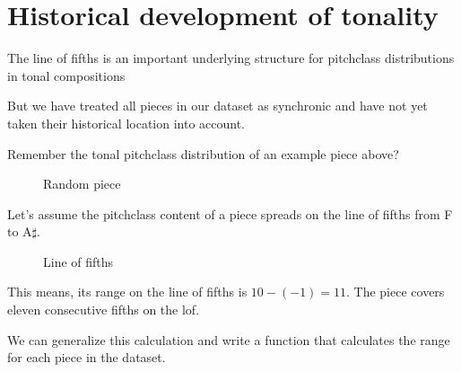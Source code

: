 \documentclass[letterpaper,10pt,english]{sphinxmanual}
\begin{document}
\section{Historical development of tonality}
\label{\detokenize{data-driven_music_history:historical-development-of-tonality}}
The line of fifths is an important underlying structure for pitch\sphinxhyphen{}class
distributions in tonal compositions

But we have treated all pieces in our dataset as synchronic and have not
yet taken their historical location into account.

Remember the tonal pitch\sphinxhyphen{}class distribution of an example piece above?

\begin{figure}[htbp]
\centering
\capstart

\noindent{}
\caption{Random piece}\label{\detokenize{data-driven_music_history:id8}}\end{figure}

Let’s assume the pitch\sphinxhyphen{}class content of a piece spreads on the line of
fifths from F to A\(\sharp\).

\begin{figure}[htbp]
\centering
\capstart

\noindent{}
\caption{Line of fifths}\label{\detokenize{data-driven_music_history:id9}}\end{figure}

This means, its range on the line of fifths is \(10 - (-1) = 11\).
The piece covers eleven consecutive fifths on the lof.

We can generalize this calculation and write a function that calculates
the range for each piece in the dataset.

\begin{sphinxVerbatim}[commandchars=\\\{\}]
 
      \PYG{p}{[}       \PYG{p}{]}
       
\end{sphinxVerbatim}

\begin{sphinxVerbatim}[commandchars=\\\{\}]
\PYG{p}{[}\PYG{p}{]}  \PYG{p}{[} \PYG{p}{]}  
\end{sphinxVerbatim}
\end{document}
